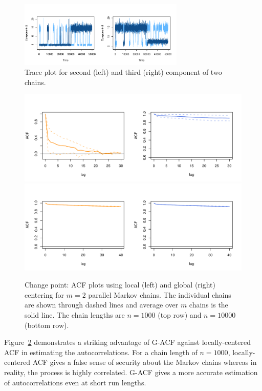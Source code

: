\documentclass[11pt]{article}
\theoremstyle{remark}
\begin{document}
\begin{figure}[htbp]
    \centering
    \includegraphics[width = 0.7\textwidth]{plots/poisson-trace_n50000.pdf}
    \caption{Trace plot for second (left) and third (right) component of two chains.}
    \label{fig:poisson-trace}
\end{figure}
\begin{figure}[htbp]
    \centering
      \includegraphics[width = .6\textwidth]{plots/poisson-acf_n1000.pdf}  \\ \vspace{-.5cm}
      \includegraphics[width = .6\textwidth]{plots/poisson-acf_n10000.pdf}      
    \caption{Change point: ACF plots using local (left) and global (right) centering for $m=2$ parallel Markov chains. The individual chains are shown through dashed lines and average over $m$ chains is the solid line. The chain lengths are $n = 1000$ (top row) and $n = 10000$ (bottom row).}
    \label{fig:poisson-acf}
\end{figure}

Figure~\ref{fig:poisson-acf} demonstrates a striking advantage of G-ACF against locally-centered ACF in estimating the autocorrelations. For a chain length of $n=1000$, locally-centered ACF gives a false sense of security about the Markov chains whereas in reality, the process is highly correlated. G-ACF gives a more accurate estimation of autocorrelations even at short run lengths.

\end{document}
